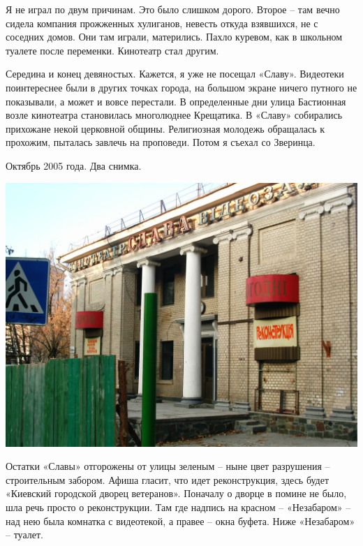 Я не играл по двум причинам. Это было слишком дорого. Второе – там вечно сидела компания прожженных хулиганов, невесть откуда взявшихся, не с соседних домов. Они там играли, матерились. Пахло куревом, как в школьном туалете после переменки. Кинотеатр стал другим. 

Середина и конец девяностых. Кажется, я уже не посещал «Славу». Видеотеки поинтереснее были в других точках города, на большом экране ничего путного не показывали, а может и вовсе перестали. В определенные дни улица Бастионная возле кинотеатра становилась многолюднее Крещатика. В «Славу» собирались прихожане некой церковной общины. Религиозная молодежь обращалась к прохожим, пыталась завлечь на проповеди. Потом я съехал со Зверинца.

Октябрь 2005 года. Два снимка.

\begin{center}
\includegraphics[width=\linewidth]{chast-vosp/zver/slava-02.jpg}
\end{center}

Остатки «Славы» отгорожены от улицы зеленым – ныне цвет разрушения – строительным забором. Афиша гласит, что идет реконструкция, здесь будет «Киевский городской дворец ветеранов». Поначалу о дворце в помине не было, шла речь просто о реконструкции. Там где надпись на красном – «Незабаром» – над нею была комнатка с видеотекой, а правее – окна буфета. Ниже «Незабаром» – туалет.

